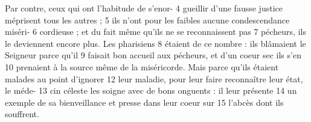 Par contre, ceux qui ont l'habitude de s'enor-	 
4	 	gueillir d'une fausse justice méprisent tous les autres ;	 
5	 	ils n'ont pour les faibles aucune condescendance miséri-	 
6	 	cordieuse ; et du fait même qu'ils ne se reconnaissent pas	 
7	 	pécheurs, ils le deviennent encore plus. Les pharisiens	 
8	 	étaient de ce nombre : ils blâmaient le Seigneur parce qu'il	 
9	 	faisait bon accueil aux pécheurs, et d'un coeur sec ils s'en	 
10	 	prenaient à la source même de la miséricorde.
Mais parce qu'ils étaient malades au point d'ignorer	 
12	 	leur maladie, pour leur faire reconnaître leur état, le méde-	 
13	 	cin céleste les soigne avec de bons onguents : il leur présente	 
14	 	un exemple de sa bienveillance et presse dans leur coeur sur	 
15	 	l'abcès dont ils souffrent.